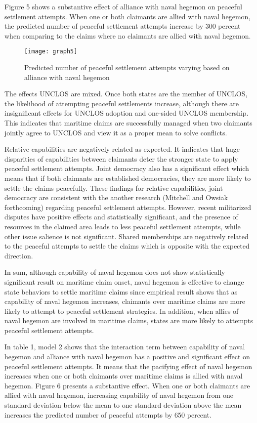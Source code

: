 \documentclass{article}
\begin{document}
Figure 5 shows a substantive effect of alliance with naval hegemon on peaceful settlement attempts. When one or both claimants are allied with naval hegemon, the predicted number of peaceful settlement attempts increase by 300 percent when comparing to the claims where no claimants are allied with naval hegemon.

\begin{figure}[h]
\centering
\texttt{[image: graph5]}
\caption{Predicted number of peaceful settlement attempts varying based on alliance with naval hegemon}
\end{figure}

The effects UNCLOS are mixed. Once both states are the member of UNCLOS, the likelihood of attempting peaceful settlements increase, although there are insignificant effects for UNCLOS adoption and one-sided UNCLOS membership. This indicates that maritime claims are successfully managed when two claimants jointly agree to UNCLOS and view it as a proper mean to solve conflicts.

Relative capabilities are negatively related as expected. It indicates that huge disparities of capabilities between claimants deter the stronger state to apply peaceful settlement attempts. Joint democracy also has a significant effect which means that if both claimants are established democracies, they are more likely to settle the claims peacefully. These findings for relative capabilities, joint democracy are consistent with the another research (Mitchell and Owsiak forthcoming) regarding peaceful settlement attempts. However, recent militarized disputes have positive effects and statistically significant, and the presence of resources in the claimed area leads to less peaceful settlement attempts, while other issue salience is not significant. Shared memberships are negatively related to the peaceful attempts to settle the claims which is opposite with the expected direction. 

In sum, although capability of naval hegemon does not show statistically significant result on maritime claim onset, naval hegemon is effective to change state behaviors to settle maritime claims since empirical result shows that as capability of naval hegemon increases, claimants over maritime claims are more likely to attempt to peaceful settlement strategies. In addition, when allies of naval hegemon are involved in maritime claims, states are more likely to attempts peaceful settlement attempts.

In table 1, model 2 shows that the interaction term between capability of naval hegemon and alliance with naval hegemon has a positive and significant effect on peaceful settlement attempts. It means that the pacifying effect of naval hegemon increases when one or both claimants over maritime claims is allied with naval hegemon. Figure 6 presents a substantive effect. When one or both claimants are allied with naval hegemon, increasing capability of naval hegemon from one standard deviation below the mean to one standard deviation above the mean increases the predicted number of peaceful attempts by 650 percent.
\end{document}
